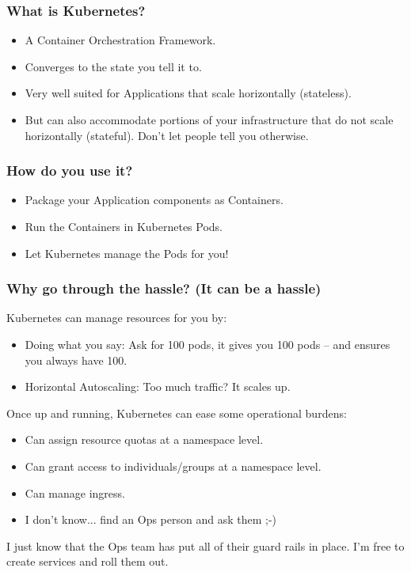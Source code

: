     \begin{frame}
        \frametitle{What is Kubernetes?}
        \begin{itemize}
            \item{A Container Orchestration Framework.}\pause
            \item{Converges to the state you tell it to.}\pause
            \item{Very well suited for Applications that scale horizontally (stateless).}\pause
            \item{But can also accommodate portions of your infrastructure that do not scale horizontally (stateful). Don't let people tell you otherwise.}
        \end{itemize}
    \end{frame}

    \begin{frame}
        \frametitle{How do you use it?}
        \begin{itemize}
            \item{Package your Application components as Containers.}\pause
            \item{Run the Containers in Kubernetes Pods.}\pause
            \item{Let Kubernetes manage the Pods for you!}
        \end{itemize}
    \end{frame}

    \begin{frame}
        \frametitle{Why go through the hassle? (It can be a hassle)}
        Kubernetes can manage resources for you by:\pause
        \begin{itemize}
            \item{Doing what you say: Ask for 100 pods, it gives you 100 pods -- and ensures you always have 100.}\pause
            \item{Horizontal Autoscaling: Too much traffic? It scales up.}\pause
        \end{itemize}
        Once up and running, Kubernetes can ease some operational burdens:\pause
        \begin{itemize}
            \item{Can assign resource quotas at a namespace level.}\pause
            \item{Can grant access to individuals/groups at a namespace level.}\pause
            \item{Can manage ingress.}\pause
            \item{I don't know... find an Ops person and ask them ;-)}\pause
        \end{itemize}
        I just know that the Ops team has put all of their guard rails in place.
        I'm free to create services and roll them out.
    \end{frame}

